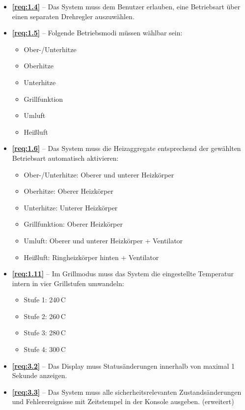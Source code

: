 \documentclass[a4paper,12pt]{article}
\begin{document}
\begin{itemize}
    \item \textbf{\ref{req:1.4}} – Das System muss dem Benutzer erlauben, eine Betriebsart über einen separaten Drehregler auszuwählen.
    \item \textbf{\ref{req:1.5}} – Folgende Betriebsmodi müssen wählbar sein:
    \begin{itemize}
        \item Ober-/Unterhitze
        \item Oberhitze
        \item Unterhitze
        \item Grillfunktion
        \item Umluft
        \item Heißluft
    \end{itemize}
    \item \textbf{\ref{req:1.6}} – Das System muss die Heizaggregate entsprechend der gewählten Betriebsart automatisch aktivieren:
    \begin{itemize}
        \item Ober-/Unterhitze: Oberer und unterer Heizkörper
        \item Oberhitze: Oberer Heizkörper
        \item Unterhitze: Unterer Heizkörper
        \item Grillfunktion: Oberer Heizkörper
        \item Umluft: Oberer und unterer Heizkörper + Ventilator
        \item Heißluft: Ringheizkörper hinten + Ventilator
    \end{itemize}
    \item \textbf{\ref{req:1.11}} – Im Grillmodus muss das System die eingestellte Temperatur intern in vier Grillstufen umwandeln:
    \begin{itemize}
        \item Stufe 1: 240\,\textdegree{}C
        \item Stufe 2: 260\,\textdegree{}C
        \item Stufe 3: 280\,\textdegree{}C
        \item Stufe 4: 300\,\textdegree{}C
    \end{itemize}
    \item \textbf{\ref{req:3.2}} – Das Display muss Statusänderungen innerhalb von maximal 1 Sekunde anzeigen.
    \item \textbf{\ref{req:3.3}} – Das System muss alle sicherheitsrelevanten Zustandsänderungen und Fehlerereignisse mit Zeitstempel in der Konsole ausgeben. (erweitert)
\end{itemize}
\end{document}
